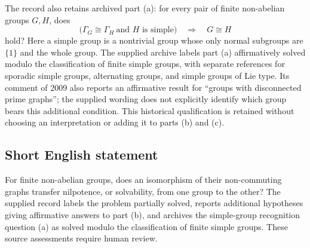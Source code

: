 \documentclass[11pt]{article}
\begin{document}
The record also retains archived part (a): for every pair of finite non-abelian groups \(G,H\), does
\[
\bigl(\Gamma_G\cong\Gamma_H\ \text{and }H\text{ is simple}\bigr)
\quad\Longrightarrow\quad G\cong H
\]
hold? Here a simple group is a nontrivial group whose only normal subgroups are \(\{1\}\) and the whole group. The supplied archive labels part (a) affirmatively solved modulo the classification of finite simple groups, with separate references for sporadic simple groups, alternating groups, and simple groups of Lie type. Its comment of 2009 also reports an affirmative result for ``groups with disconnected prime graphs''; the supplied wording does not explicitly identify which group bears this additional condition. This historical qualification is retained without choosing an interpretation or adding it to parts (b) and (c).
\subsection{Short English statement}
For finite non-abelian groups, does an isomorphism of their non-commuting graphs transfer nilpotence, or solvability, from one group to the other? The supplied record labels the problem partially solved, reports additional hypotheses giving affirmative answers to part (b), and archives the simple-group recognition question (a) as solved modulo the classification of finite simple groups. These source assessments require human review.
\end{document}

